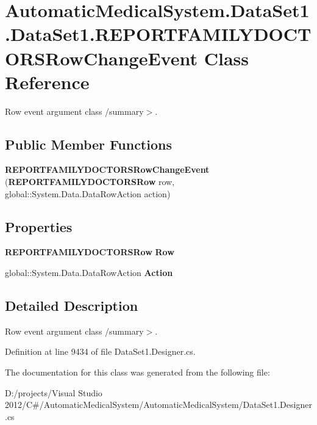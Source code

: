 \section{AutomaticMedicalSystem.DataSet1.DataSet1.REPORTFAMILYDOCTORSRowChangeEvent Class Reference}
\label{class_automatic_medical_system_1_1_data_set1_1_1_r_e_p_o_r_t_f_a_m_i_l_y_d_o_c_t_o_r_s_row_change_event}
Row event argument class /summary$>$.  


\subsection*{Public Member Functions}
\begin{CompactItemize}
\item 
\textbf{REPORTFAMILYDOCTORSRowChangeEvent} ({\bf REPORTFAMILYDOCTORSRow} row, global::System.Data.DataRowAction action)\label{class_automatic_medical_system_1_1_data_set1_1_1_r_e_p_o_r_t_f_a_m_i_l_y_d_o_c_t_o_r_s_row_change_event_cd844abedddf337d95c4eacf0cc166f9}

\end{CompactItemize}
\subsection*{Properties}
\begin{CompactItemize}
\item 
{\bf REPORTFAMILYDOCTORSRow} \textbf{Row}\hspace{0.3cm}{\tt  [get]}\label{class_automatic_medical_system_1_1_data_set1_1_1_r_e_p_o_r_t_f_a_m_i_l_y_d_o_c_t_o_r_s_row_change_event_0f1043d36f02e120355271556f2b84b4}

\item 
global::System.Data.DataRowAction \textbf{Action}\hspace{0.3cm}{\tt  [get]}\label{class_automatic_medical_system_1_1_data_set1_1_1_r_e_p_o_r_t_f_a_m_i_l_y_d_o_c_t_o_r_s_row_change_event_ba690d4f090c027db7645496766a1f74}

\end{CompactItemize}


\subsection{Detailed Description}
Row event argument class /summary$>$. 

Definition at line 9434 of file DataSet1.Designer.cs.

The documentation for this class was generated from the following file:\begin{CompactItemize}
\item 
D:/projects/Visual Studio 2012/C\#/AutomaticMedicalSystem/AutomaticMedicalSystem/DataSet1.Designer.cs\end{CompactItemize}
